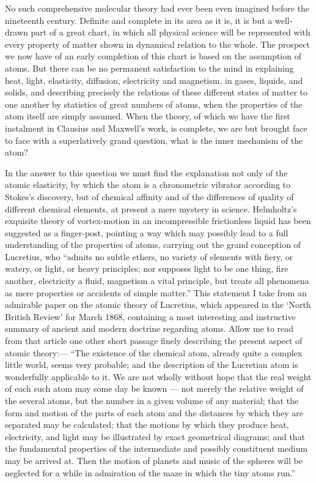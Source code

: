 \documentclass[a4paper, 11pt, oneside, english]{article}
\begin{document}
No such comprehensive molecular theory had ever been even imagined before the nineteenth century. Definite and complete in its area as it is, it is but a well-drawn part of a great chart, in which all physical science will be represented with every property of matter shown in dynamical relation to the whole. The prospect we now have of an early completion of this chart is based on the assumption of atoms. But there can be no permanent satisfaction to the mind in explaining heat, light, elasticity, diffusion, electricity and magnetism, in gases, liquids, and solids, and describing precisely the relations of these different states of matter to one another by statistics of great numbers of atoms, when the properties of the atom itself are simply assumed. When the theory, of which we have the first instalment in Clausius and Maxwell's work, is complete, we are but brought face to face with a superlatively grand question, what is the inner mechanism of the atom?

In the answer to this question we must find the explanation not only of the atomic elasticity, by which the atom is a chronometric vibrator according to Stokes's discovery, but of chemical affinity and of the differences of quality of different chemical elements, at present a mere mystery in science. Helmholtz's exquisite theory of vortex-motion in an incompressible frictionless liquid has been suggested as a finger-post, pointing a way which may possibly lead to a full understanding of the properties of atoms, carrying out the grand conception of Lucretius, who ``admits no subtle ethers, no variety of elements with fiery, or watery, or light, or heavy principles; nor supposes light to be one thing, fire another, electricity a fluid, magnetism a vital principle, but treats all phenomena as mere properties or accidents of simple matter.'' This statement I take from an admirable paper on the atomic theory of Lucretius, which appeared in the `North British Review' for March 1868, containing a most interesting and instructive summary of ancient and modern doctrine regarding atoms. Allow me to read from that article one other short passage finely describing the present aspect of atomic theory:--- ``The existence of the chemical atom, already quite a complex little world, seems very probable; and the description of the Lucretian atom is wonderfully applicable to it. We are not wholly without hope that the real weight of each such atom may some day be known --- not merely the relative weight of the several atoms, but the number in a given volume of any material; that the form and motion of the parts of each atom and the distances by which they are separated may be calculated; that the motions by which they produce heat, electricity, and light may be illustrated by exact geometrical diagrams; and that the fundamental properties of the intermediate and possibly constituent medium may be arrived at. Then the motion of planets and music of the spheres will be neglected for a while in admiration of the maze in which the tiny atoms run.''
\end{document}
